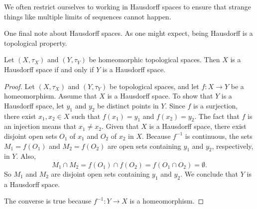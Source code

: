 %

We often restrict ourselves to working in Hausdorff spaces to ensure that strange things like multiple limits of sequences cannot happen. 



 One final note about Hausdorff spaces. As one might expect, being Hausdorff is a topological property.
 


\begin{theorem} Let $(X, \tau_X)$ and $(Y, \tau_Y)$ be homeomorphic topological spaces. Then $X$ is a Hausdorff space if and only if $Y$ is a Hausdorff space. 
\end{theorem}

\begin{proof} Let $(X, \tau_X)$ and $(Y, \tau_Y)$ be topological spaces, and let $f : X \to Y$ be a homeomorphism. Assume that $X$ is a Hausdorff space. To show that $Y$ is a Hausdorff space, let $y_1$ and $y_2$ be distinct points in $Y$. Since $f$ is a surjection, there exist $x_1, x_2 \in X$ such that $f(x_1) = y_1$ and $f(x_2)=y_2$. The fact that $f$ is an injection means that $x_1 \neq x_2$. Given that $X$ is a Hausdorff space, there exist disjoint open sets $O_1$ of $x_1$ and $O_2$ of $x_2$ in $X$. Because $f^{-1}$ is continuous, the sets $M_1=f(O_1)$ and $M_2 = f(O_2)$ are open sets containing $y_1$ and $y_2$, respectively, in $Y$. Also,
\[M_1 \cap M_2 = f(O_1) \cap f(O_2) = f(O_1 \cap O_2) = \emptyset.\]
So $M_1$ and $M_2$ are disjoint open sets containing $y_1$ and $y_2$. We conclude that $Y$ is a Hausdorff space. 

The converse is true because $f^{-1}: Y \to X$ is a homeomorphism.
\end{proof}

